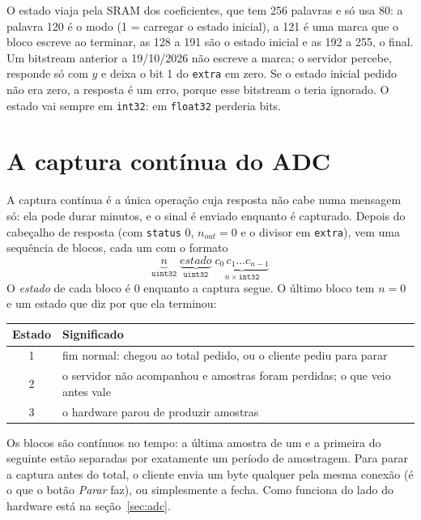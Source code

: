 O estado viaja pela SRAM dos coeficientes, que tem 256 palavras e só usa 80:
a palavra 120 é o modo (1 = carregar o estado inicial), a 121 é uma marca que
o bloco escreve ao terminar, as 128 a 191 são o estado inicial e as 192 a 255,
o final. Um bitstream anterior a 19/10/2026 não escreve a marca; o servidor
percebe, responde só com \(y\) e deixa o bit 1 do \texttt{extra} em zero. Se o
estado inicial pedido não era zero, a resposta é um erro, porque esse
bitstream o teria ignorado. O estado vai sempre em \texttt{int32}: em
\texttt{float32} perderia bits.

\section{A captura contínua do ADC}
\label{sec:adc-continuo}

A captura contínua é a única operação cuja resposta não cabe numa mensagem só:
ela pode durar minutos, e o sinal é enviado enquanto é capturado. Depois do
cabeçalho de resposta (com \texttt{status} 0, \(n_{out} = 0\) e o divisor em
\texttt{extra}), vem uma sequência de blocos, cada um com o formato
\[
  \underbrace{n}_{\texttt{uint32}}\;
  \underbrace{\textit{estado}}_{\texttt{uint32}}\;
  \underbrace{c_0\, c_1 \ldots c_{n-1}}_{n \times \texttt{int32}}
\]
O \textit{estado} de cada bloco é 0 enquanto a captura segue. O último bloco
tem \(n = 0\) e um estado que diz por que ela terminou:

\begin{center}
\small
\begin{tabular}{@{}cl@{}}
  \toprule
  \textbf{Estado} & \textbf{Significado} \\
  \midrule
  1 & fim normal: chegou ao total pedido, ou o cliente pediu para parar \\
  2 & o servidor não acompanhou e amostras foram perdidas; o que veio antes vale \\
  3 & o hardware parou de produzir amostras \\
  \bottomrule
\end{tabular}
\end{center}

Os blocos são contínuos no tempo: a última amostra de um e a primeira do
seguinte estão separadas por exatamente um período de amostragem. Para parar a
captura antes do total, o cliente envia um byte qualquer pela mesma conexão
(é o que o botão \emph{Parar} faz), ou simplesmente a fecha. Como funciona do
lado do hardware está na seção~\ref{sec:adc}.

